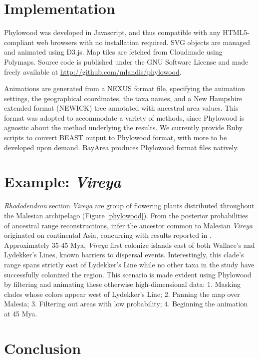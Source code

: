 \documentclass[11pt]{article}
\begin{document}
\section{Implementation}

Phylowood was developed in Javascript, and thus compatible with any HTML5-compliant web browsers with no installation required. SVG objects are managed and animated using D3.js. Map tiles are fetched from Cloudmade using Polymaps. Source code is published under the GNU Software License and made freely available at \url{http://github.com/mlandis/phylowood}.

Animations are generated from a NEXUS format file, specifying the animation settings, the geographical coordinates, the taxa names, and a New Hampshire extended format (NEWICK) tree annotated with ancestral area values. This format was adopted to accommodate a variety of methods, since Phylowood is agnostic about the method underlying the results. We currently provide Ruby scripts to convert BEAST output to Phylowood format, with more to be developed upon demand. BayArea produces Phylowood format files natively.

\section{Example: {\it Vireya}}

{\it Rhododendron} section {\it Vireya} are group of flowering plants distributed throughout the Malesian archipelago (Figure \ref{phylowood}). From the posterior probabilities of ancestral range reconstructions, \cite{landis12} infer the ancestor common to Malesian {\it Vireya} originated on continental Asia, concurring with results reported in \cite{webb12}. Approximately 35-45 Mya, {\it Vireya} first colonize islands east of both Wallace's and Lydekker's Lines, known barriers to dispersal events. Interestingly, this clade's range spans strictly east of Lydekker's Line while no other taxa in the study have successfully colonized the region. This scenario is made evident using Phylowood by filtering and animating these otherwise high-dimensional data: 1. Masking clades whose colors appear west of Lydekker's Line; 2. Panning the map over Malesia; 3. Filtering out areas with low probability; 4. Beginning the animation at 45 Mya.

\section{Conclusion}
\end{document}
